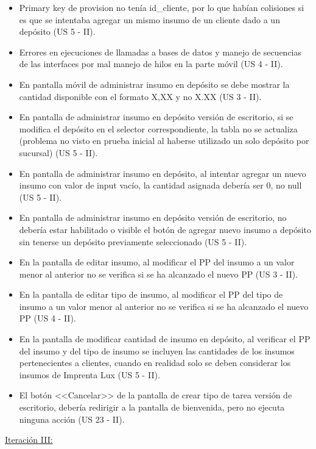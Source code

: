 \documentclass[a4paper, 12pt,twoside]{report}  %
\numberwithin{equation}{subsection} %
\begin{document}
\begin{itemize}
	\item Primary key de provision no tenía id\_cliente, por lo que habían colisiones si es que se intentaba agregar un mismo insumo de un cliente dado a un depósito (US 5 - II).
	\item Errores en ejecuciones de llamadas a bases de datos y manejo de secuencias de las interfaces por mal manejo de hilos en la parte móvil (US 4 - II).
	\item En pantalla móvil de administrar insumo en depósito se debe mostrar la cantidad disponible con el formato X,XX y no X.XX (US 3 - II).
	\item En pantalla de administrar insumo en depósito versión de escritorio, si se modifica el depósito en el selector correspondiente, la tabla no se actualiza (problema no visto en prueba inicial al haberse utilizado un solo depósito por sucursal) (US 5 - II).
	\item En pantalla de administrar insumo en depósito, al intentar agregar un nuevo insumo con valor de input vacío, la cantidad asignada debería ser 0, no null (US 5 - II).
	\item En pantalla de administrar insumo en depósito versión de escritorio, no debería estar habilitado o visible el botón de agregar nuevo insumo a depósito sin tenerse un depósito previamente seleccionado (US 5 - II).
	\item En la pantalla de editar insumo, al modificar el PP del insumo a un valor menor al anterior no se verifica si se ha alcanzado el nuevo PP (US 3 - II).
	\item En la pantalla de editar tipo de insumo, al modificar el PP del tipo de insumo a un valor menor al anterior no se verifica si se ha alcanzado el nuevo PP (US 4 - II).
	\item En la pantalla de modificar cantidad de insumo en depósito, al verificar el PP del insumo y del tipo de insumo se incluyen las cantidades de los insumos pertenecientes a clientes, cuando en realidad solo se deben considerar los insumos de Imprenta Lux (US 5 - II).
	\item El botón <<Cancelar>> de la pantalla de crear tipo de tarea versión de escritorio, debería redirigir a la pantalla de bienvenida, pero no ejecuta ninguna acción (US 23 - II).
\end{itemize}
\underline{Iteración III:}
\end{document}
